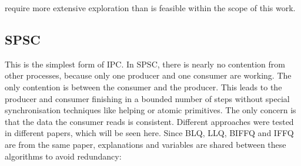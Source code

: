require more extensive exploration than is feasible within the scope of this work.

\subsection{\acf{SPSC}}\label{subsec:single-producer-and-single-consumer}
This is the simplest form of \ac{IPC}. In \ac{SPSC}, there is nearly no contention from other processes, because only one producer and one consumer are working. The only contention is between the consumer and the producer. This leads to the producer and consumer finishing in a bounded number of steps without special synchronisation techniques like helping or atomic primitives. The only concern is that the data the consumer reads is consistent. Different approaches were tested in different papers, which will be seen here. Since \ac{BLQ}, \ac{LLQ}, \ac{BIFFQ} and \ac{IFFQ} are from the same paper, explanations and variables are shared between these algorithms to avoid redundancy:

